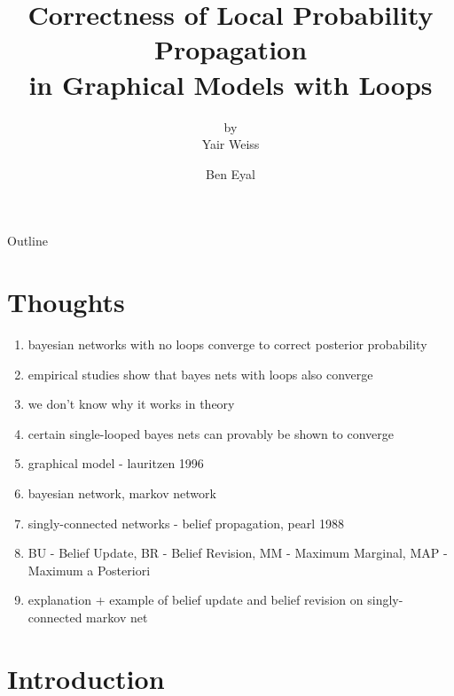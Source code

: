 \documentclass{beamer}
\title[]{Correctness of Local Probability Propagation\\in Graphical Models with Loops}
\subtitle{by\\Yair Weiss}
\author{Ben Eyal}
\begin{document}
\begin{frame}
    \titlepage
\end{frame}

\begin{frame}{Outline}
    \tableofcontents
\end{frame}

\section{Thoughts}
\begin{frame}
    \begin{enumerate}
        \item bayesian networks with no loops converge to correct posterior probability
        \item empirical studies show that bayes nets with loops also converge
        \item we don't know why it works in theory
        \item certain single-looped bayes nets can provably be shown to converge
        \item graphical model - lauritzen 1996
        \item bayesian network, markov network
        \item singly-connected networks - belief propagation, pearl 1988
        \item BU - Belief Update, BR - Belief Revision, MM - Maximum Marginal, MAP - Maximum a Posteriori
        \item explanation + example of belief update and belief revision on singly-connected markov net
    \end{enumerate}
\end{frame}
\section{Introduction}
\end{document}
